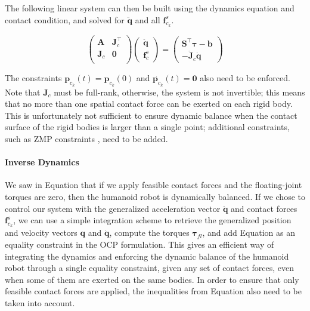 The following linear system can then be built using the dynamics
equation and contact condition, and solved for $\ddot{\mathbf{q}}$ and
all $\mathbf{f}^s_{c_k}$.

\begin{equation}
  \left(\begin{matrix}
    \mathbf{A} & \mathbf{J}_{c}^\top \\
    \mathbf{J}_{c} & \mathbf{0}\\
  \end{matrix}\right)
  \left(\begin{matrix}
  \ddot{\mathbf{q}}\\
  \mathbf{f}^s_{c}
  \end{matrix}\right)
  = \left(\begin{matrix} \mathbf{S}^\top\boldsymbol{\tau}-\mathbf{b}
    \\ -\dot{\mathbf{J}}_{c}\dot{\mathbf{q}}
  \end{matrix}\right)
\end{equation}

The constraints $\mathbf{p}_{c_k}(t)=\mathbf{p}_{c_k}(0)$ and
$\dot{\mathbf{p}_{c_k}}(t)=\mathbf{0}$ also need to be enforced. Note
that $\mathbf{J}_{c}$ must be full-rank, otherwise, the system is not
invertible; this means that no more than one spatial contact force can
be exerted on each rigid body. This is unfortunately not sufficient to
ensure dynamic balance when the contact surface of the rigid bodies is
larger than a single point; additional constraints, such as ZMP
constraints \cite{koch2012optimization}, need to be added.

\paragraph{Inverse Dynamics}

We saw in Equation  that if we
apply feasible contact forces and the floating-joint torques are zero,
then the humanoid robot is dynamically balanced. If we chose to
control our system with the generalized acceleration vector
$\mathbf{\ddot{q}}$ and contact forces $\mathbf{f}^s_{c_k}$, we can use
a simple integration scheme to retrieve the generalized position and
velocity vectors $\mathbf{q}$ and $\mathbf{\dot{q}}$, compute the
torques $\boldsymbol{\tau}_{fl}$, and add Equation
 as an equality constraint in
the OCP formulation. This gives an efficient way of integrating the
dynamics and enforcing the dynamic balance of the humanoid robot
through a single equality constraint, given any set of contact forces,
even when some of them are exerted on the same bodies. In order to
ensure that only feasible contact forces are applied, the inequalities
from Equation  also need to be taken into
account.

